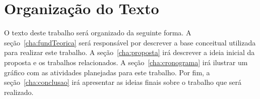 \section{Organização do Texto}
O texto deste trabalho será organizado da seguinte forma. A
seção~\ref{cha:fundTeorica} será responsável por descrever a base conceitual
utilizada para realizar este trabalho. A seção~\ref{cha:proposta} irá descrever
a ideia inicial da proposta e os trabalhos relacionados. A
seção~\ref{cha:cronograma} irá ilustrar um gráfico com as atividades planejadas
para este trabalho. Por fim, a seção~\ref{cha:conclusao} irá apresentar as
ideias finais sobre o trabalho que será realizado.














